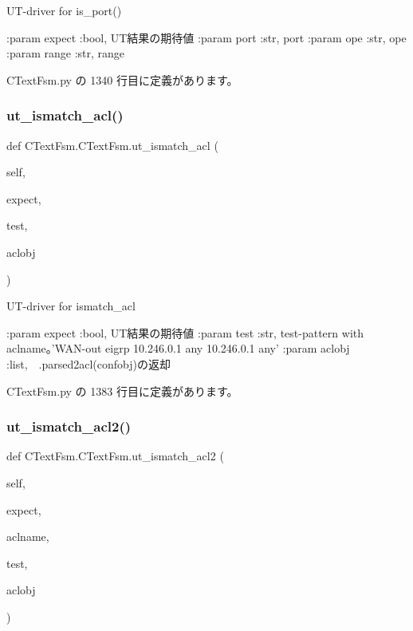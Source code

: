 \begin{DoxyVerb}UT-driver for is_port()

:param expect :bool, UT結果の期待値
:param port   :str, port
:param ope    :str, ope
:param range  :str, range
\end{DoxyVerb}
 

 C\+Text\+Fsm.\+py の 1340 行目に定義があります。

\mbox{\label{classCTextFsm_1_1CTextFsm_a9708d882f46a66cee6ae8c47766ef50b}} 
\subsubsection{\texorpdfstring{ut\_ismatch\_acl()}{ut\_ismatch\_acl()}}
{\footnotesize\ttfamily def C\+Text\+Fsm.\+C\+Text\+Fsm.\+ut\+\_\+ismatch\+\_\+acl (\begin{DoxyParamCaption}\item[{}]{self,  }\item[{}]{expect,  }\item[{}]{test,  }\item[{}]{aclobj }\end{DoxyParamCaption})}

\begin{DoxyVerb}UT-driver for ismatch_acl

:param expect :bool, UT結果の期待値
:param test   :str,  test-pattern with aclname。'WAN-out eigrp 10.246.0.1 any 10.246.0.1 any'
:param aclobj :list,　.parsed2acl(confobj)の返却
\end{DoxyVerb}
 

 C\+Text\+Fsm.\+py の 1383 行目に定義があります。

\mbox{\label{classCTextFsm_1_1CTextFsm_ae3ecec0b7d2f27e81faee975998bd860}} 
\subsubsection{\texorpdfstring{ut\_ismatch\_acl2()}{ut\_ismatch\_acl2()}}
{\footnotesize\ttfamily def C\+Text\+Fsm.\+C\+Text\+Fsm.\+ut\+\_\+ismatch\+\_\+acl2 (\begin{DoxyParamCaption}\item[{}]{self,  }\item[{}]{expect,  }\item[{}]{aclname,  }\item[{}]{test,  }\item[{}]{aclobj }\end{DoxyParamCaption})}

